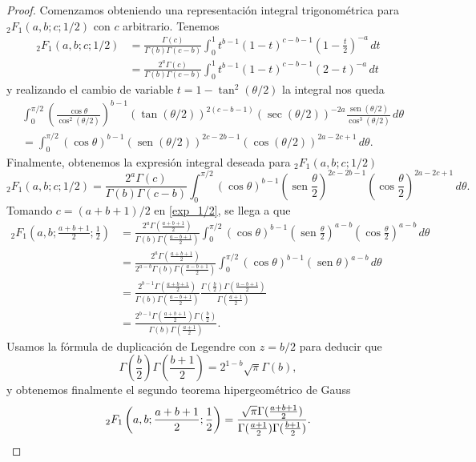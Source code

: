 \documentclass[12pt,a4paper]{book}
\renewcommand{\sin}{\operatorname{sen}}
\begin{document}
\begin{proof}
Comenzamos obteniendo una representación integral trigonométrica para ${}_{2}F_{1}(a,b;c;1/2)$ con $c$ arbitrario. Tenemos
\begin{align*}
  {}_{2}F_{1}(a,b;c;1/2) &=  
  \frac{\Gamma(c)}{\Gamma(b)\Gamma(c-b)} \int_0^1 t^{b-1} (1-t)^{c-b-1} \left(1-\frac{t}{2}\right)^{-a} \, dt \\ 
  &= \frac{2^a\Gamma(c)}{\Gamma(b)\Gamma(c-b)} \int_0^1 t^{b-1} (1-t)^{c-b-1} (2-t)^{-a} \, dt
\end{align*}
y realizando el cambio de variable $t = 1 - \tan^2(\theta/2)$ la integral nos queda
\begin{align*}
    &\int_0^{\pi/2} \left( \frac{\cos\theta}{\cos^2(\theta/2)} \right)^{b-1}(\tan(\theta/2))^{2(c-b-1)}(\sec(\theta/2))^{-2a} \frac{\sin(\theta/2)}{\cos^3(\theta/2)} \, d\theta \\ 
    &= \int_0^{\pi/2} (\cos\theta)^{b-1} (\sin(\theta/2))^{2c-2b-1} (\cos(\theta/2))^{2a-2c+1} \, d\theta.
\end{align*}
Finalmente, obtenemos la expresión integral deseada para  ${}_{2}F_{1}(a,b;c;1/2)$
\begin{equation}
\label{exp_1/2}
  {}_{2}F_{1}(a,b;c;1/2) = \frac{2^a\Gamma(c)}{\Gamma(b)\Gamma(c-b)} \int_0^{\pi/2} (\cos\theta)^{b-1} \left(\sin\frac{\theta}{2}\right)^{2c-2b-1} \left(\cos\frac{\theta}{2}\right)^{2a-2c+1} \, d\theta.  
\end{equation}
Tomando $c = (a+b+1)/2$ en \eqref{exp_1/2}, se llega a que
\begin{align*}
    {}_{2}F_{1}\left(a, b; \frac{a+b+1}{2}; \frac{1}{2}\right) &= \frac{2^a\Gamma(\frac{a+b+1}{2})}{\Gamma(b)\Gamma(\frac{a-b+1}{2})} \int_0^{\pi/2} (\cos\theta)^{b-1} \left(\sin\frac{\theta}{2}\right)^{a-b} \left(\cos\frac{\theta}{2}\right)^{a-b} \, d\theta \\
    &= \frac{2^a\Gamma(\frac{a+b+1}{2})}{2^{a-b}\Gamma(b)\Gamma(\frac{a-b+1}{2})} \int_0^{\pi/2} (\cos\theta)^{b-1} (\sin\theta)^{a-b} \, d\theta \\
    &= \frac{2^{b-1}\Gamma(\frac{a+b+1}{2})}{\Gamma(b)\Gamma(\frac{a-b+1}{2})} \frac{\Gamma(\frac{b}{2})\Gamma(\frac{a-b+1}{2})}{\Gamma(\frac{a+1}{2})} \\
    &= \frac{2^{b-1}\Gamma(\frac{a+b+1}{2})\Gamma(\frac{b}{2})}{\Gamma(b)\Gamma(\frac{a+1}{2})}.
\end{align*}
Usamos la fórmula de duplicación de Legendre con $z = b/2$ para deducir que
\[
\Gamma\left(\frac{b}{2}\right)\Gamma\left(\frac{b+1}{2}\right) = 2^{1-b}\sqrt{\pi}\Gamma(b),
\]
y obtenemos finalmente el segundo teorema hipergeométrico de Gauss
\[ 
{}_{2}F_{1}\left(a, b; \frac{a+b+1}{2}; \frac{1}{2}\right) = \frac{\sqrt{\pi} \Gamma(\frac{a+b+1}{2})}{\Gamma(\frac{a+1}{2})\Gamma(\frac{b+1}{2})}.
\qedhere
\]
\end{proof}
\end{document}
